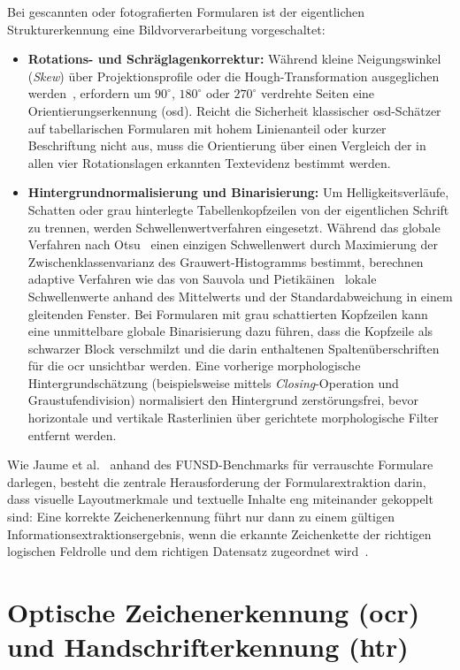 Bei gescannten oder fotografierten Formularen ist der eigentlichen Strukturerkennung eine Bildvorverarbeitung vorgeschaltet:
\begin{itemize}
  \item \textbf{Rotations- und Schräglagenkorrektur:} Während kleine Neigungswinkel (\emph{Skew}) über Projektionsprofile oder die Hough-Transformation ausgeglichen werden~\cite{OGorman1997DIA}, erfordern um $90^\circ$, $180^\circ$ oder $270^\circ$ verdrehte Seiten eine Orientierungserkennung (\ac{osd}). Reicht die Sicherheit klassischer \ac{osd}-Schätzer auf tabellarischen Formularen mit hohem Linienanteil oder kurzer Beschriftung nicht aus, muss die Orientierung über einen Vergleich der in allen vier Rotationslagen erkannten Textevidenz bestimmt werden.
  \item \textbf{Hintergrundnormalisierung und Binarisierung:} Um Helligkeitsverläufe, Schatten oder grau hinterlegte Tabellenkopfzeilen von der eigentlichen Schrift zu trennen, werden Schwellenwertverfahren eingesetzt. Während das globale Verfahren nach Otsu~\cite{Otsu1979Threshold} einen einzigen Schwellenwert durch Maximierung der Zwischenklassenvarianz des Grauwert-Histogramms bestimmt, berechnen adaptive Verfahren wie das von Sauvola und Pietikäinen~\cite{Sauvola2000Binarization} lokale Schwellenwerte anhand des Mittelwerts und der Standardabweichung in einem gleitenden Fenster. Bei Formularen mit grau schattierten Kopfzeilen kann eine unmittelbare globale Binarisierung dazu führen, dass die Kopfzeile als schwarzer Block verschmilzt und die darin enthaltenen Spaltenüberschriften für die \ac{ocr} unsichtbar werden. Eine vorherige morphologische Hintergrundschätzung (beispielsweise mittels \emph{Closing}-Operation und Graustufendivision) normalisiert den Hintergrund zerstörungsfrei, bevor horizontale und vertikale Rasterlinien über gerichtete morphologische Filter entfernt werden.
\end{itemize}

Wie Jaume et al.~\cite{Jaume2019FUNSD} anhand des FUNSD-Benchmarks für verrauschte Formulare darlegen, besteht die zentrale Herausforderung der Formularextraktion darin, dass visuelle Layoutmerkmale und textuelle Inhalte eng miteinander gekoppelt sind: Eine korrekte Zeichenerkennung führt nur dann zu einem gültigen Informationsextraktionsergebnis, wenn die erkannte Zeichenkette der richtigen logischen Feldrolle und dem richtigen Datensatz zugeordnet wird~\cite{Skalicky2022Benchmarks}.

\section{Optische Zeichenerkennung (\texorpdfstring{\acs{ocr}}{OCR}) und Handschrifterkennung (\texorpdfstring{\acs{htr}}{HTR})}
\label{sec:ocr-htr}

